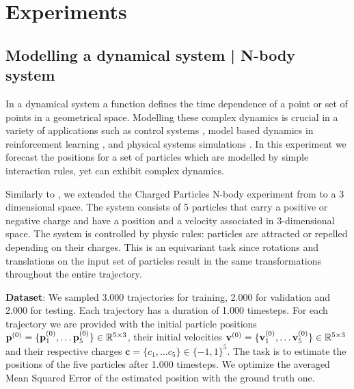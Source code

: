 \section{Experiments}

\subsection{Modelling a dynamical system | N-body system } \label{sec:experiment_n_body}

In a dynamical system a function defines the time dependence of a point or set of points in a geometrical space. Modelling these complex dynamics is crucial in a variety of applications such as control systems \cite{chua2018deep}, model based dynamics in reinforcement learning \cite{nagabandi2018neural}, and physical systems simulations \cite{grzeszczuk1998neuroanimator, watters2017visual}. In this experiment we forecast the positions for a set of particles which are modelled by simple interaction rules, yet can exhibit complex dynamics.

Similarly to \cite{fuchs2020se}, we extended the Charged Particles N-body experiment from \cite{kipf2018neural} to a 3 dimensional space. The system consists of 5 particles that carry a positive or negative charge and have a position and a velocity associated in 3-dimensional space. The system is controlled by physic rules: particles are attracted or repelled depending on their charges. This is an equivariant task since rotations and translations on the input set of particles result in the same transformations throughout the entire trajectory. 


\textbf{Dataset}: We sampled 3.000 trajectories for training, 2.000 for validation and 2.000 for testing. Each trajectory has a duration of 1.000 timesteps. For each trajectory we are provided with the initial particle positions $\mathbf{p}^{(0)}=\{ \mathbf{p}^{(0)}_1, \dots \mathbf{p}^{(0)}_5 \} \in \mathbb{R}^{5 \times 3}$, their initial velocities $\mathbf{v}^{(0)}=\{ \mathbf{v}^{(0)}_1, \dots \mathbf{v}^{(0)}_5 \} \in \mathbb{R}^{5 \times 3}$ and their respective charges $\mathbf{c} = \{c_1, \dots c_5\} \in \{-1, 1\}^5$. The task is to estimate the positions of the five particles after 1.000 timesteps. We optimize the averaged Mean Squared Error of the estimated position with the ground truth one.


